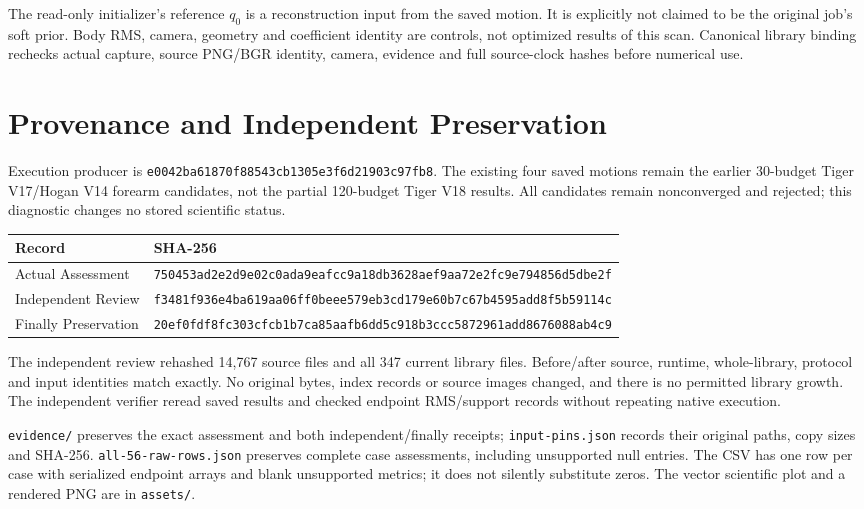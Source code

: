 \documentclass[11pt,letterpaper]{article}
\newcommand{\code}[1]{\nolinkurl{#1}}\newcommand{\hash}[1]{{\footnotesize\nolinkurl{#1}}}
\begin{document}
The read-only initializer's reference $q_0$ is a reconstruction input from the
saved motion. It is explicitly not claimed to be the original job's soft prior.
Body RMS, camera, geometry and coefficient identity are controls, not optimized
results of this scan. Canonical library binding rechecks actual capture, source
PNG/BGR identity, camera, evidence and full source-clock hashes before numerical use.
\newpage
\section{Provenance and Independent Preservation}
Execution producer is \hash{e0042ba61870f88543cb1305e3f6d21903c97fb8}.
The existing four saved motions remain the earlier 30-budget Tiger V17/Hogan V14
forearm candidates, not the partial 120-budget Tiger V18 results. All candidates
remain nonconverged and rejected; this diagnostic changes no stored scientific status.

\begin{tabular}{@{}p{.23\linewidth}p{.70\linewidth}@{}}\toprule
Record & SHA-256\\\midrule
Actual Assessment & \hash{750453ad2e2d9e02c0ada9eafcc9a18db3628aef9aa72e2fc9e794856d5dbe2f}\\
Independent Review & \hash{f3481f936e4ba619aa06ff0beee579eb3cd179e60b7c67b4595add8f5b59114c}\\
Finally Preservation & \hash{20ef0fdf8fc303cfcb1b7ca85aafb6dd5c918b3ccc5872961add8676088ab4c9}\\\bottomrule
\end{tabular}\par\smallskip
The independent review rehashed 14,767 source files and all 347 current library
files. Before/after source, runtime, whole-library, protocol and input identities
match exactly. No original bytes, index records or source images changed, and
there is no permitted library growth. The independent verifier reread saved results
and checked endpoint RMS/support records without repeating native execution.

\code{evidence/} preserves the exact assessment and both independent/finally receipts;
\code{input-pins.json} records their original paths, copy sizes and SHA-256.
\code{all-56-raw-rows.json} preserves complete case assessments, including unsupported
null entries. The CSV has one row per case with serialized endpoint arrays and blank
unsupported metrics; it does not silently substitute zeros. The vector scientific
plot and a rendered PNG are in \code{assets/}.
\end{document}
